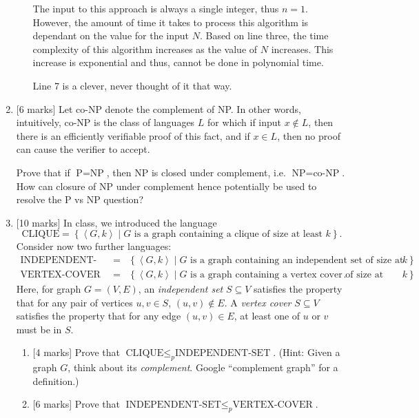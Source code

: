 \documentclass{article}
\newcommand{\class}[1]{\text{#1}}
\newcommand{\set}[1]{{\left\{#1\right\}}}    %
\newcommand{\enc}[1]{\left<#1\right>}
\begin{document}
\begin{enumerate}
\begin{enumerate}
            The input to this approach is always a single integer, thus $n = 1$.
            However, the amount of time it takes to process this algorithm is dependant on the value for the input $N$.
            Based on line three, the time complexity of this algorithm increases as the value of $N$ increases.
            This increase is exponential and thus, cannot be done in polynomial time.

            Line 7 is a clever, never thought of it that way.

    \end{enumerate}
    \item {[6 marks]}
          Let co-NP denote the complement of NP. In other words, intuitively, co-NP is the class of languages $L$ for which if input $x\not\in L$, then there is an efficiently verifiable proof of this fact, and if $x\in L$, then no proof can cause the verifier to accept.

            Prove that if $\class{P}=\class{NP}$, then NP is closed under complement, i.e. $\class{NP}=\class{co-NP}$. How can closure of NP under complement hence potentially be used to resolve the P vs NP question?


    \item {[10 marks]} In class, we introduced the language
    \[
        \class{CLIQUE} = \set{\enc{G,k}\mid G\text{ is a graph containing a clique of size at least }k}.
    \]
    Consider now two further languages:
    \begin{eqnarray*}
        \class{INDEPENDENT-SET} &=& \set{\enc{G,k}\mid G\text{ is a graph containing an independent set of size at least }k}\\
        \class{VERTEX-COVER} &=& \set{\enc{G,k}\mid G\text{ is a graph containing a vertex cover of size at most }k}.
    \end{eqnarray*}
    Here, for graph $G=(V,E)$, an \emph{independent set} $S\subseteq V$ satisfies the property that for any pair of vertices $u,v\in S$, $(u,v)\not\in E$. A \emph{vertex cover} $S\subseteq V$ satisfies the property that for any edge $(u,v)\in E$, at least one of $u$ or $v$ must be in $S$.
    \begin{enumerate}
        \item {[4 marks]} Prove that $\class{CLIQUE}\leq_p\class{INDEPENDENT-SET}$. (Hint: Given a graph $G$, think about its \emph{complement}. Google ``complement graph'' for a definition.)
        \item {[6 marks]} Prove that $\class{INDEPENDENT-SET}\leq_p\class{VERTEX-COVER}$.


\end{enumerate}
\end{enumerate}
\end{document}
